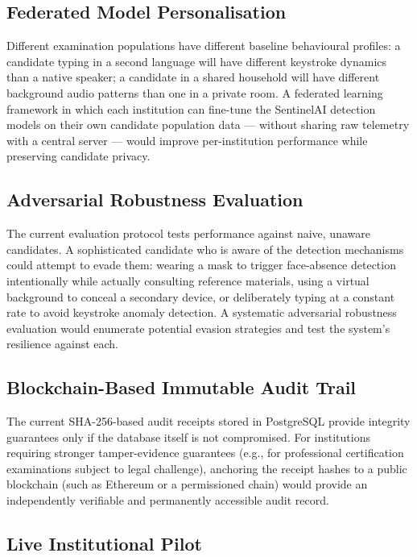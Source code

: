 \subsection{Federated Model Personalisation}

Different examination populations have different baseline behavioural profiles: a candidate typing in a second language will have different keystroke dynamics than a native speaker; a candidate in a shared household will have different background audio patterns than one in a private room. A federated learning framework in which each institution can fine-tune the SentinelAI detection models on their own candidate population data --- without sharing raw telemetry with a central server --- would improve per-institution performance while preserving candidate privacy.

\subsection{Adversarial Robustness Evaluation}

The current evaluation protocol tests performance against naive, unaware candidates. A sophisticated candidate who is aware of the detection mechanisms could attempt to evade them: wearing a mask to trigger face-absence detection intentionally while actually consulting reference materials, using a virtual background to conceal a secondary device, or deliberately typing at a constant rate to avoid keystroke anomaly detection. A systematic adversarial robustness evaluation would enumerate potential evasion strategies and test the system's resilience against each.

\subsection{Blockchain-Based Immutable Audit Trail}

The current SHA-256-based audit receipts stored in PostgreSQL provide integrity guarantees only if the database itself is not compromised. For institutions requiring stronger tamper-evidence guarantees (e.g., for professional certification examinations subject to legal challenge), anchoring the receipt hashes to a public blockchain (such as Ethereum or a permissioned chain) would provide an independently verifiable and permanently accessible audit record.

\subsection{Live Institutional Pilot}

